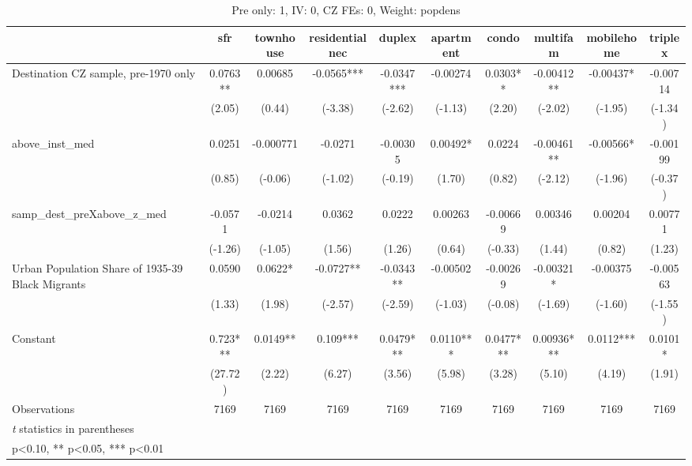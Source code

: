 \begin{table}[htbp]\centering
\def\sym#1{\ifmmode^{#1}\else\(^{#1}\)\fi}
\caption{Pre only: 1, IV: 0, CZ FEs: 0, Weight: popdens}
\begin{tabular}{l*{9}{c}}
\toprule
                    &\multicolumn{1}{c}{sfr}&\multicolumn{1}{c}{townhouse}&\multicolumn{1}{c}{residentialnec}&\multicolumn{1}{c}{duplex}&\multicolumn{1}{c}{apartment}&\multicolumn{1}{c}{condo}&\multicolumn{1}{c}{multifam}&\multicolumn{1}{c}{mobilehome}&\multicolumn{1}{c}{triplex}\\
\midrule
Destination CZ sample, pre-1970 only&      0.0763** &     0.00685   &     -0.0565***&     -0.0347***&    -0.00274   &      0.0303** &    -0.00412** &    -0.00437*  &    -0.00714   \\
                    &      (2.05)   &      (0.44)   &     (-3.38)   &     (-2.62)   &     (-1.13)   &      (2.20)   &     (-2.02)   &     (-1.95)   &     (-1.34)   \\
\addlinespace
above\_inst\_med      &      0.0251   &   -0.000771   &     -0.0271   &    -0.00305   &     0.00492*  &      0.0224   &    -0.00461** &    -0.00566*  &    -0.00199   \\
                    &      (0.85)   &     (-0.06)   &     (-1.02)   &     (-0.19)   &      (1.70)   &      (0.82)   &     (-2.12)   &     (-1.96)   &     (-0.37)   \\
\addlinespace
samp\_dest\_preXabove\_z\_med&     -0.0571   &     -0.0214   &      0.0362   &      0.0222   &     0.00263   &    -0.00669   &     0.00346   &     0.00204   &     0.00771   \\
                    &     (-1.26)   &     (-1.05)   &      (1.56)   &      (1.26)   &      (0.64)   &     (-0.33)   &      (1.44)   &      (0.82)   &      (1.23)   \\
\addlinespace
Urban Population Share of 1935-39 Black Migrants&      0.0590   &      0.0622*  &     -0.0727** &     -0.0343** &    -0.00502   &    -0.00269   &    -0.00321*  &    -0.00375   &    -0.00563   \\
                    &      (1.33)   &      (1.98)   &     (-2.57)   &     (-2.59)   &     (-1.03)   &     (-0.08)   &     (-1.69)   &     (-1.60)   &     (-1.55)   \\
\addlinespace
Constant            &       0.723***&      0.0149** &       0.109***&      0.0479***&      0.0110***&      0.0477***&     0.00936***&      0.0112***&      0.0101*  \\
                    &     (27.72)   &      (2.22)   &      (6.27)   &      (3.56)   &      (5.98)   &      (3.28)   &      (5.10)   &      (4.19)   &      (1.91)   \\
\midrule
Observations        &        7169   &        7169   &        7169   &        7169   &        7169   &        7169   &        7169   &        7169   &        7169   \\
\bottomrule
\multicolumn{10}{l}{\footnotesize \textit{t} statistics in parentheses}\\
\multicolumn{10}{l}{\footnotesize * p<0.10, ** p<0.05, *** p<0.01}\\
\end{tabular}
\end{table}
